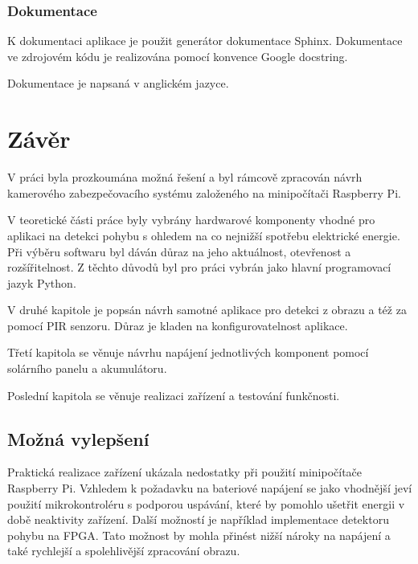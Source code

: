 

\subsection*{Dokumentace}
K dokumentaci aplikace je použit generátor dokumentace Sphinx. Dokumentace ve zdrojovém kódu je realizována pomocí konvence Google docstring.

Dokumentace je napsaná v anglickém jazyce.


\chapter{Závěr}

V práci byla prozkoumána možná řešení a byl rámcově zpracován návrh kamerového zabezpečovacího systému založeného na minipočítači Raspberry Pi. 

V teoretické části práce byly vybrány hardwarové komponenty vhodné pro aplikaci na detekci pohybu s ohledem na co nejnižší spotřebu elektrické energie. Při výběru softwaru byl dáván důraz na jeho aktuálnost, otevřenost a rozšířitelnost. Z těchto důvodů byl pro práci vybrán jako hlavní programovací jazyk Python.  

V druhé kapitole je popsán návrh samotné aplikace pro detekci z obrazu a též za pomocí PIR senzoru. Důraz je kladen na konfigurovatelnost aplikace.

Třetí kapitola se věnuje návrhu napájení jednotlivých komponent pomocí solárního panelu a akumulátoru.

Poslední kapitola se věnuje realizaci zařízení a testování funkčnosti.

\section{Možná vylepšení}
Praktická realizace zařízení ukázala nedostatky při použití minipočítače Raspberry Pi. Vzhledem k požadavku na bateriové napájení se jako vhodnější jeví použití mikrokontroléru s podporou uspávání, které by pomohlo ušetřit energii v době neaktivity zařízení. Další možností je například implementace detektoru pohybu na FPGA. Tato možnost by mohla přinést nižší nároky na napájení a také rychlejší a spolehlivější zpracování obrazu.

